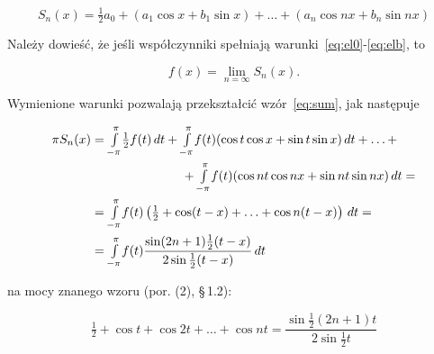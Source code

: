 \documentclass[leqno]{book}
\newcommand{\parsign}[0]{\S\,}
\begin{document}
    \begin{equation}
        \label{eq:sum}
        S_n(x) = \tfrac{1}{2} a_{0} + (a_1 \cos x + b_1 \sin x) + \ldots + (a_n \cos nx + b_n \sin nx)
    \end{equation}

    Należy dowieść, że jeśli współczynniki spełniają warunki~\eqref{eq:el0}-\eqref{eq:elb}, to

    \begin{equation}
        \label{eq:fS}
        f(x) = \lim_{n = \infty} S_n(x) \text{.}
    \end{equation}

    Wymienione warunki pozwalają przekształcić wzór~\eqref{eq:sum}, jak następuje

    \begin{gather}
        \begin{align}
            \pi S_n(x) & = \mathsmaller{\int\limits_{-\pi}^{\pi}} \tfrac{1}{2} f(t) \,dt + \mathsmaller{\int\limits_{-\pi}^{\pi}} f(t)(\cos t \cos x + \sin t \sin x) \,dt +
            \ldots + \\
            & \kern 6pc + \mathsmaller{\int\limits_{-\pi}^{\pi}} f(t)(\cos nt \cos nx + \sin nt \sin nx) \,dt = \notag\\
            & = \mathsmaller{\int\limits_{-\pi}^{\pi}} f(t)\left(\tfrac{1}{2} + \cos (t -x) + \ldots + \cos n(t - x)\right) \,dt = \notag\\
            & = \mathsmaller{\int\limits_{-\pi}^{\pi}} f(t) \frac{\sin (2n + 1) \frac{1}{2} (t - x)}{2 \sin \frac{1}{2} (t - x)} \,dt \notag
        \end{align}
        \raisetag{3\baselineskip}
    \end{gather}

    \noindent
    na mocy znanego wzoru (por. (2), \parsign 1.2):

    \[
        \tfrac{1}{2} + \cos t + \cos 2t + \ldots + \cos nt = \frac{\sin \frac{1}{2} (2n + 1) t}{2 \sin \frac{1}{2} t}
    \]
\end{document}
